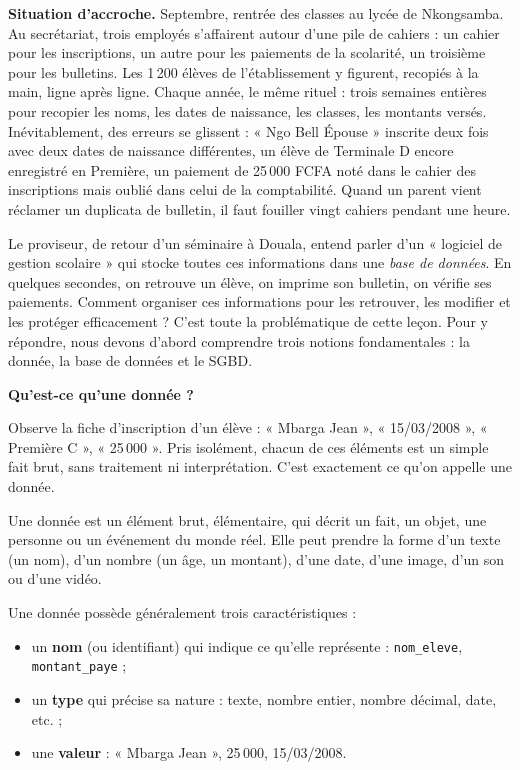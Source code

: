 \documentclass[11pt]{article}
\newcommand{\cle}[1]{{\popxbold\color{popdark}#1}}
\newcounter{popsec}
\newcounter{popsub}
\newcommand{\courssub}[1]{%
  \stepcounter{popsub}%
  \par\vspace{9pt}\noindent{\popxbold\fontsize{11.5}{13}\selectfont\color{popink}{\color{poporange}\thepopsec.\thepopsub}\hspace{6pt}#1}\par\nopagebreak\vspace{4pt}
}
\begin{document}
\textbf{Situation d'accroche.} Septembre, rentrée des classes au lycée de Nkongsamba. Au secrétariat, trois employés s'affairent autour d'une pile de cahiers : un cahier pour les inscriptions, un autre pour les paiements de la scolarité, un troisième pour les bulletins. Les 1\,200 élèves de l'établissement y figurent, recopiés à la main, ligne après ligne. Chaque année, le même rituel : trois semaines entières pour recopier les noms, les dates de naissance, les classes, les montants versés. Inévitablement, des erreurs se glissent : « Ngo Bell Épouse » inscrite deux fois avec deux dates de naissance différentes, un élève de Terminale D encore enregistré en Première, un paiement de 25\,000 FCFA noté dans le cahier des inscriptions mais oublié dans celui de la comptabilité. Quand un parent vient réclamer un duplicata de bulletin, il faut fouiller vingt cahiers pendant une heure.

Le proviseur, de retour d'un séminaire à Douala, entend parler d'un « logiciel de gestion scolaire » qui stocke toutes ces informations dans une \emph{base de données}. En quelques secondes, on retrouve un élève, on imprime son bulletin, on vérifie ses paiements. Comment organiser ces informations pour les retrouver, les modifier et les protéger efficacement ? C'est toute la problématique de cette leçon. Pour y répondre, nous devons d'abord comprendre trois notions fondamentales : la \cle{donnée}, la \cle{base de données} et le \cle{SGBD}.

\courssub{De la donnée à l'information}

\textbf{Qu'est-ce qu'une donnée ?}\par

Observe la fiche d'inscription d'un élève : « Mbarga Jean », « 15/03/2008 », « Première C », « 25\,000 ». Pris isolément, chacun de ces éléments est un simple fait brut, sans traitement ni interprétation. C'est exactement ce qu'on appelle une donnée.

\begin{definition}[Donnée]
Une \cle{donnée} est un élément brut, élémentaire, qui décrit un fait, un objet, une personne ou un événement du monde réel. Elle peut prendre la forme d'un texte (un nom), d'un nombre (un âge, un montant), d'une date, d'une image, d'un son ou d'une vidéo.
\end{definition}

Une donnée possède généralement trois caractéristiques :
\begin{itemize}
  \item un \textbf{nom} (ou identifiant) qui indique ce qu'elle représente : \texttt{nom\_eleve}, \texttt{montant\_paye} ;
  \item un \textbf{type} qui précise sa nature : texte, nombre entier, nombre décimal, date, etc. ;
  \item une \textbf{valeur} : « Mbarga Jean », 25\,000, 15/03/2008.
\end{itemize}
\end{document}
